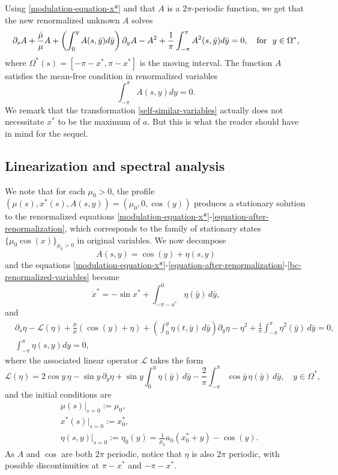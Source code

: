 \documentclass[12pt]{amsart}
\numberwithin{equation}{section}
\numberwithin{equation}{section}
\begin{document}
Using \eqref{modulation-equation-x*} and that $A$ is a 2$\pi$-periodic function, we get that the new renormalized unknown $A$ solves 
\begin{equation}\label{equation-after-renormalization}
\partial_s A+\frac{\dot{\mu}}{\mu} A +\left(\int_{0}^y A(s,\bar y)d\bar y\right)\partial_y A-A^2+\frac{1}{\pi}\int_{-\pi}^\pi A^2(s,\bar y)d\bar y=0, \quad {\rm for}~~ y\in\Omega^*,
\end{equation}
where $\Omega^*(s)=[-\pi-x^*, \pi-x^*]$ is the moving interval. The function $A$ satisfies the mean-free condition in renormalized variables
\begin{equation} \label{bc-renormalized-variables}
\int_{-\pi}^\pi A(s,y)dy=0.
\end{equation}
We remark that the transformation \eqref{self-similar-variables} actually does not necessitate $x^*$ to be the maximum of $a$. But this is what the reader should have in mind for the sequel.

  
\subsection{Linearization and spectral analysis}

We note that for each $\mu_0>0$,  the profile $(\mu(s), x^*(s), A(s,y))=(\mu_0, 0, \cos(y))$ produces a stationary solution to the renormalized equations \eqref{modulation-equation-x*}-\eqref{equation-after-renormalization}, which corresponds to the family of stationary states $\{{\mu_0} \cos(x)\}_{{\mu_0}>0}$ in original variables. We now decompose
$$
A(s,y)=\cos(y)+\eta(s,y)
$$
and the equations \eqref{modulation-equation-x*}-\eqref{equation-after-renormalization}-\eqref{bc-renormalized-variables} become
\begin{equation}\label{eq-x*}
 \dot{x}^*  = -\sin x^* +\int_{-\pi-x^*}^0 \eta(\bar y)\,d \bar y,
 \end{equation}
and
\begin{align}\label{eq-eta}
& \partial_s \eta - \mathcal{L}(\eta)+\frac{\dot{\mu}}{\mu}\left(\cos(y)+\eta \right) +  \left(\int_{0}^y \eta(t, \bar y) \,d\bar y\right) \partial_y \eta  -\eta^2 +\frac{1}{\pi}  \int_{-\pi}^{\pi}\eta^2(\bar y)\,d\bar y=0, \\
& \label{bc-renormalized-variables-2} \int_{-\pi}^\pi \eta(s,y)dy=0, 
\end{align}
where the associated linear operator $\mathcal{L}$ takes the form
\begin{equation*}
\mathcal{L}(\eta)= 2\cos y \,\eta -\sin y\,\partial_y \eta +\sin y \int_{0}^y \eta( \bar y) \,d\bar y - \frac{2}{\pi}  \int_{-\pi}^{\pi}\cos \bar y\, \eta(  \bar y)\,d\bar y, \quad y\in\Omega^*,
\end{equation*}
and the initial conditions are
\begin{align}
&\mu(s)|_{s=0}:=\mu_0,\\
&x^*(s)|_{s=0}:=x^*_0,\\
&\eta(s, y)|_{s=0}:=\eta_0(y)=  \frac{1}{\mu_0}a_0(x^*_0+y)-\cos (y). \label{definition-eta0}
\end{align}
As $A$ and $\cos$ are both $2\pi$ periodic, notice that $\eta$ is also $2\pi$ periodic, with possible discontinuities at $\pi-x^*$ and $-\pi-x^*$.
 
\end{document}
